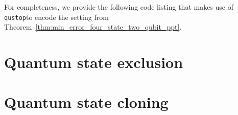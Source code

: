 \documentclass[11pt]{article}
\theoremstyle{definition}
\newcommand{\qustop}{\texttt{qustop}}
\begin{document}
For completeness, we provide the following code listing that makes use of
\qustop to encode the setting from
Theorem~\ref{thm:min_error_four_state_two_qubit_ppt}.

\begin{figure}[!htpb]
    \centering
    
    \caption{}
    \label{fig:ppt_four_state_two_qubit}
\end{figure}

\section{Quantum state exclusion}
\label{sec:qse}

\section{Quantum state cloning}
\label{sec:qsc}





\end{document}
